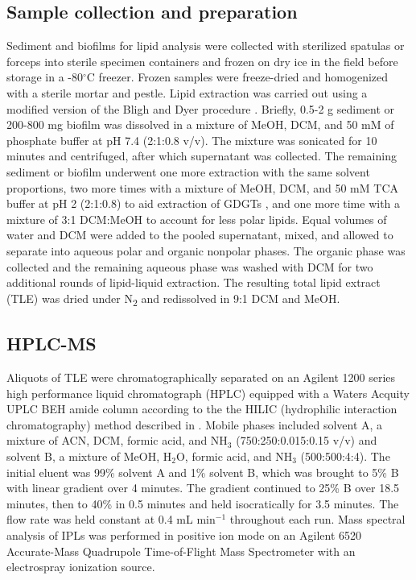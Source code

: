 \subsection{Sample collection and preparation} Sediment and biofilms for lipid analysis were collected with sterilized spatulas or forceps into sterile specimen containers and frozen on dry ice in the field before storage in a -80$^{\circ}$C freezer. Frozen samples were freeze-dried and homogenized with a sterile mortar and pestle. Lipid extraction was carried out using a modified version of the Bligh and Dyer procedure \citep{white1998signature}. Briefly, 0.5-2 g sediment or 200-800 mg biofilm was dissolved in a mixture of MeOH, DCM, and 50 mM of phosphate buffer at pH 7.4 (2:1:0.8 v/v). The mixture was sonicated for 10 minutes and centrifuged, after which supernatant was collected. The remaining sediment or biofilm underwent one more extraction with the same solvent proportions, two more times with a mixture of MeOH, DCM, and 50 mM TCA buffer at pH 2 (2:1:0.8) to aid extraction of GDGTs \citep{nishihara1987extraction}, and one more time with a mixture of 3:1 DCM:MeOH to account for less polar lipids. Equal volumes of water and DCM were added to the pooled supernatant, mixed, and allowed to separate into aqueous polar and organic nonpolar phases. The organic phase was collected and the remaining aqueous phase was washed with DCM for two additional rounds of lipid-liquid extraction. The resulting total lipid extract (TLE) was dried under N\textsubscript{2} and redissolved in 9:1 DCM and MeOH.

\subsection{HPLC-MS} Aliquots of TLE were chromatographically separated on an Agilent 1200 series high performance liquid chromatograph (HPLC) equipped with a Waters Acquity UPLC BEH amide column according to the the HILIC (hydrophilic interaction chromatography) method described in \cite{Wrmer_Application_2013}. Mobile phases included solvent A, a mixture of ACN, DCM, formic acid, and NH$_{3}$ (750:250:0.015:0.15 v/v) and solvent B, a mixture of MeOH, H$_{2}$O, formic acid, and NH$_{3}$ (500:500:4:4). The initial eluent was 99\% solvent A and 1\% solvent B, which was brought to 5\% B with linear gradient over 4 minutes. The gradient continued to 25\% B over 18.5 minutes, then to 40\% in 0.5 minutes and held isocratically for 3.5 minutes. The flow rate was held constant at 0.4 mL min$^{-1}$ throughout each run. Mass spectral analysis of IPLs was performed in positive ion mode on an Agilent 6520 Accurate-Mass Quadrupole Time-of-Flight Mass Spectrometer with an electrospray ionization source.

